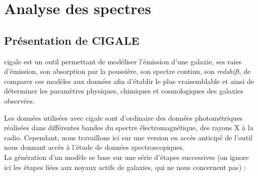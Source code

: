 \documentclass[12pt, a4paper]{article}
\begin{document}
\section{Analyse des spectres}

\subsection{Présentation de CIGALE}

\gls{cigale} \parencite{cigale} est un outil permettant de modéliser l'émission d'une galaxie, ses raies d'émission, son absorption par la poussière, son spectre continu, son \textit{redshift}, de comparer ces modèles aux données afin d'établir le plus vraisemblable et ainsi de déterminer les paramètres physiques, chimiques et cosmologiques des galaxies observées.

Les données utilisées avec \gls{cigale} sont d'ordinaire des données photométriques réalisées dans différentes bandes du spectre électromagnétique, des rayons X à la radio. Cependant, nous travaillons ici sur une version en accès anticipé de l'outil nous donnant accès à l'étude de données spectroscopiques.\\

La génération d'un modèle se base sur une série d'étapes successives (on ignore ici les étapes liées aux noyaux actifs de galaxies, qui ne nous concernent pas) :
\end{document}
